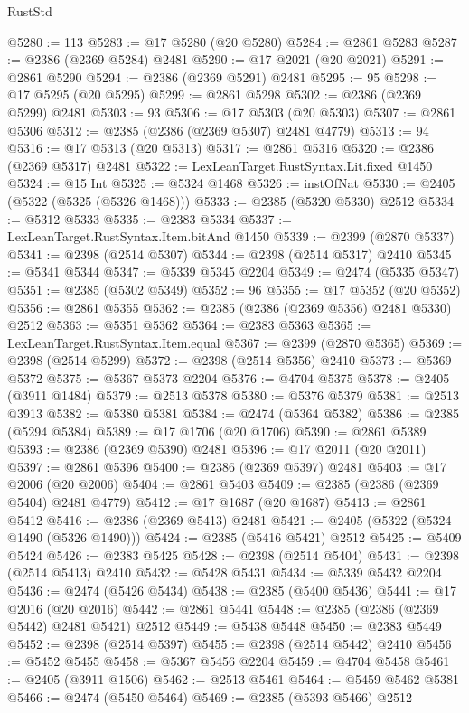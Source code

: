 \begin{lexlean}{RustStd}
\begin{coremodule}
@5280 := 113
@5283 := @17 @5280 (@20 @5280)
@5284 := @2861 @5283
@5287 := @2386 (@2369 @5284) @2481
@5290 := @17 @2021 (@20 @2021)
@5291 := @2861 @5290
@5294 := @2386 (@2369 @5291) @2481
@5295 := 95
@5298 := @17 @5295 (@20 @5295)
@5299 := @2861 @5298
@5302 := @2386 (@2369 @5299) @2481
@5303 := 93
@5306 := @17 @5303 (@20 @5303)
@5307 := @2861 @5306
@5312 := @2385 (@2386 (@2369 @5307) @2481 @4779)
@5313 := 94
@5316 := @17 @5313 (@20 @5313)
@5317 := @2861 @5316
@5320 := @2386 (@2369 @5317) @2481
@5322 := LexLeanTarget.RustSyntax.Lit.fixed @1450
@5324 := @15 Int
@5325 := @5324 @1468
@5326 := instOfNat
@5330 := @2405 (@5322 (@5325 (@5326 @1468)))
@5333 := @2385 (@5320 @5330) @2512
@5334 := @5312 @5333
@5335 := @2383 @5334
@5337 := LexLeanTarget.RustSyntax.Item.bitAnd @1450
@5339 := @2399 (@2870 @5337)
@5341 := @2398 (@2514 @5307)
@5344 := @2398 (@2514 @5317) @2410
@5345 := @5341 @5344
@5347 := @5339 @5345 @2204
@5349 := @2474 (@5335 @5347)
@5351 := @2385 (@5302 @5349)
@5352 := 96
@5355 := @17 @5352 (@20 @5352)
@5356 := @2861 @5355
@5362 := @2385 (@2386 (@2369 @5356) @2481 @5330) @2512
@5363 := @5351 @5362
@5364 := @2383 @5363
@5365 := LexLeanTarget.RustSyntax.Item.equal
@5367 := @2399 (@2870 @5365)
@5369 := @2398 (@2514 @5299)
@5372 := @2398 (@2514 @5356) @2410
@5373 := @5369 @5372
@5375 := @5367 @5373 @2204
@5376 := @4704 @5375
@5378 := @2405 (@3911 @1484)
@5379 := @2513 @5378
@5380 := @5376 @5379
@5381 := @2513 @3913
@5382 := @5380 @5381
@5384 := @2474 (@5364 @5382)
@5386 := @2385 (@5294 @5384)
@5389 := @17 @1706 (@20 @1706)
@5390 := @2861 @5389
@5393 := @2386 (@2369 @5390) @2481
@5396 := @17 @2011 (@20 @2011)
@5397 := @2861 @5396
@5400 := @2386 (@2369 @5397) @2481
@5403 := @17 @2006 (@20 @2006)
@5404 := @2861 @5403
@5409 := @2385 (@2386 (@2369 @5404) @2481 @4779)
@5412 := @17 @1687 (@20 @1687)
@5413 := @2861 @5412
@5416 := @2386 (@2369 @5413) @2481
@5421 := @2405 (@5322 (@5324 @1490 (@5326 @1490)))
@5424 := @2385 (@5416 @5421) @2512
@5425 := @5409 @5424
@5426 := @2383 @5425
@5428 := @2398 (@2514 @5404)
@5431 := @2398 (@2514 @5413) @2410
@5432 := @5428 @5431
@5434 := @5339 @5432 @2204
@5436 := @2474 (@5426 @5434)
@5438 := @2385 (@5400 @5436)
@5441 := @17 @2016 (@20 @2016)
@5442 := @2861 @5441
@5448 := @2385 (@2386 (@2369 @5442) @2481 @5421) @2512
@5449 := @5438 @5448
@5450 := @2383 @5449
@5452 := @2398 (@2514 @5397)
@5455 := @2398 (@2514 @5442) @2410
@5456 := @5452 @5455
@5458 := @5367 @5456 @2204
@5459 := @4704 @5458
@5461 := @2405 (@3911 @1506)
@5462 := @2513 @5461
@5464 := @5459 @5462 @5381
@5466 := @2474 (@5450 @5464)
@5469 := @2385 (@5393 @5466) @2512

\end{coremodule}
\end{lexlean}
